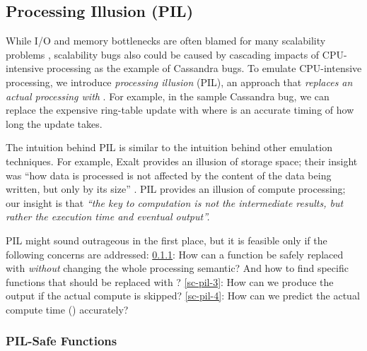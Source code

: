 

\subsection{Processing Illusion (PIL)}
\label{sc-pil}

While I/O and memory bottlenecks are often blamed for many scalability problems
\cite{Ousterhout+15-MakingSense,Konstantin+10-HDFSScalability, Wang+14-Exalt},
scalability bugs also could be caused by cascading impacts of CPU-intensive
processing as the example of Cassandra bugs.
%
To emulate CPU-intensive processing, we introduce {\em processing illusion}
(PIL), an approach that {\em replaces an actual processing with \sleep}.  For
example, in the sample Cassandra bug, we can replace the expensive ring-table
update with  where  is an accurate timing of how long the
update takes.


The intuition behind PIL is similar to the intuition behind other
emulation techniques.
%
For example, Exalt provides an illusion of storage space; their insight
was ``how data is processed is  not affected by the content of the data
being written, but only by its size'' \cite{Wang+14-Exalt}.
%
PIL provides an illusion of compute processing; our insight is that
{\em ``the
  key to computation is not the intermediate results, but rather the
  execution time and eventual output''.}
%

PIL might sound outrageous in the first place, but it is feasible only if 
the following concerns are addressed:
%
%
\sec\ref{sc-pil-1}: How can a function be safely replaced
with \sleep \textit{without} changing the whole processing semantic?
And how to find specific functions that should be replaced with \sleep?
%
\sec\ref{sc-pil-3}: How can we produce the output if the actual compute is
skipped?
%
\sec\ref{sc-pil-4}: How can we predict the actual compute time ()
accurately?

\subsubsection{PIL-Safe Functions}
\label{sc-pil-1}

